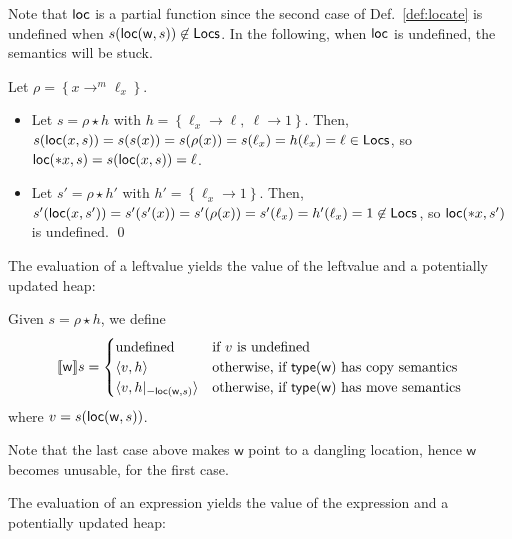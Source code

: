 \noindent
Note that $\loc$ is a partial function since the second case of
Def.~\ref{def:locate} is undefined when
$s(\loc(\mathsf{w},s))\not\in\Locs$. In the following, when $\loc$ is undefined, the
semantics will be stuck.

\begin{example}
  Let $\rho = \left\{x\rightarrow^m\ell_x\right\}$.
  \begin{itemize}
    \item Let $s = \rho\star h$ with
    $h = \left\{\ell_x\rightarrow\ell,\ \ell\rightarrow 1\right\}$.
    Then, $s(\loc(x,s)) = s(s(x)) = s(\rho(x)) = s(\ell_x) =
    h(\ell_x) = \ell\in\Locs$, so
    $\loc(\mathtt{*}x,s)= s(\loc(x,s)) = \ell$.
    \item Let $s' = \rho\star h'$ with
    $h' = \left\{\ell_x\rightarrow 1\right\}$. Then,
    $s'(\loc(x,s')) = s'(s'(x)) = s'(\rho(x)) = s'(\ell_x) =
    h'(\ell_x) = 1 \not\in\Locs$, so $\loc(\mathtt{*}x,s')$ is undefined.
    \qed
  \end{itemize}
\end{example}

The evaluation of a leftvalue yields the value of the leftvalue and a potentially updated heap:

\begin{definition}\label{def:semantics_leftvalues}
  Given $s=\rho\star h$, we define
  \[
  \den[\mathsf{w}]{s}=\begin{cases}
  \text{undefined} & \text{if $v$ is undefined}\\
  \langle v, h\rangle & \text{otherwise, if $\type(\mathsf{w})$ has copy semantics}\\
  \langle v, h|_{-\loc(\mathsf{w},s)}\rangle & \text{otherwise, if $\type(\mathsf{w})$ has move semantics}
  \end{cases}
  \]
  where $v=s(\loc(\mathsf{w},s))$.
\end{definition}

\noindent
Note that the last case above makes $\mathsf{w}$ point to a dangling location, hence
$\mathsf{w}$ becomes unusable, for the first case.

The evaluation of an expression yields the value of the expression and a potentially updated heap:

